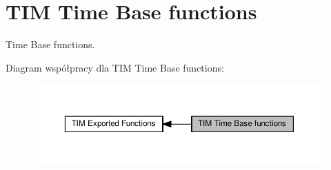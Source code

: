 \hypertarget{group___t_i_m___exported___functions___group1}{}\section{T\+IM Time Base functions}
\label{group___t_i_m___exported___functions___group1}


Time Base functions.  


Diagram współpracy dla T\+IM Time Base functions\+:\nopagebreak
\begin{figure}[H]
\begin{center}
\leavevmode
\includegraphics[width=350pt]{group___t_i_m___exported___functions___group1}
\end{center}
\end{figure}
